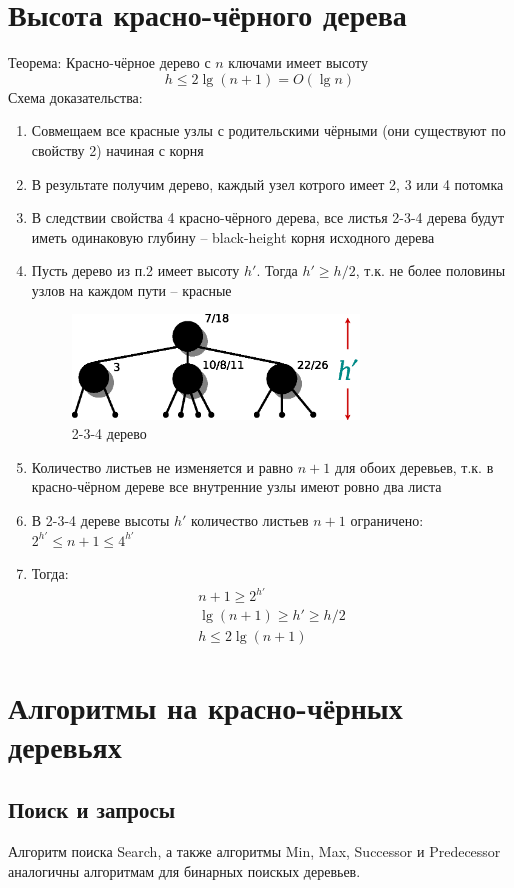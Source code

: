 \documentclass[11pt]{article}
\begin{document}
\section{Высота красно-чёрного дерева}
Теорема: Красно-чёрное дерево с $n$ ключами имеет высоту
\begin{equation*}
  h \leqslant 2 \lg (n+1) = O(\lg n)
\end{equation*}
Схема доказательства:
\begin{enumerate}
\item Совмещаем все красные узлы с родительскими чёрными (они существуют по свойству 2) начиная с корня
\item В результате получим дерево, каждый узел котрого имеет 2, 3 или 4 потомка
\item В следствии свойства 4 красно-чёрного дерева, все листья 2-3-4 дерева будут иметь одинаковую глубину -- black-height корня исходного дерева
\item Пусть дерево из п.2 имеет высоту $h'$. Тогда $h' \geqslant h/2$, т.к. не более половины узлов на каждом пути -- красные
\begin{figure}[ht]
  \centering
  \includegraphics[width=3in]{lecture10/2-3-4.eps}
  \caption{2-3-4 дерево}
  \label{fig:2-3-4}
\end{figure}
\item Количество листьев не изменяется и равно $n+1$ для обоих деревьев, т.к. в красно-чёрном дереве все внутренние узлы имеют ровно два листа
\item В 2-3-4 дереве высоты $h'$ количество листьев $n+1$ ограничено: $2^{h'} \leqslant n+1 \leqslant 4^{h'}$
\item Тогда:
\begin{align*}
  n+1 \geqslant 2^{h'} \\
  \lg(n+1) \geqslant h' \geqslant h/2 \\
  h \leqslant 2 \lg (n+1)
\end{align*}
\end{enumerate}
%
\section{Алгоритмы на красно-чёрных деревьях}
\subsection{Поиск и запросы}
Алгоритм поиска Search, а также алгоритмы Min, Max, Successor и Predecessor аналогичны алгоритмам для бинарных поискых деревьев.
\end{document}
